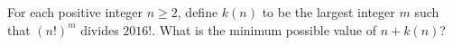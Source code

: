 For each positive integer $n\geq2$, define $k(n)$ to be the largest integer $m$ such that $(n!)^m$ divides $2016!$. What is the minimum possible value of $n+k(n)$?